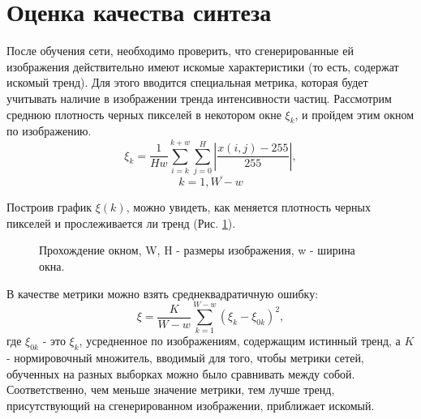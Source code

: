 \clearpage
\section{Оценка качества синтеза}
	После обучения сети, необходимо проверить, что сгенерированные ей изображения действительно имеют искомые характеристики (то есть, содержат искомый тренд). Для этого вводится специальная метрика, которая будет учитывать наличие в изображении тренда интенсивности частиц. Рассмотрим среднюю плотность черных пикселей в некотором окне $\xi_k$, и пройдем этим окном по изображению.
	$$\xi_k = \frac{1}{H w}{\sum_{i=k}^{k+w} \sum_{j=0}^{H}\left| \frac{x(i, j) - 255}{255} \right|}, $$$$k = \overline{1, W - w} $$
	
	Построив график $\xi(k)$, можно увидеть, как меняется плотность черных пикселей и прослеживается ли тренд (Рис. \ref{7-window}).
	
	\begin{figure}[h!]
		\caption{Прохождение окном, W, H - размеры изображения, w - ширина окна.}
		\label{7-window}
	\end{figure}
	
	В качестве метрики можно взять среднеквадратичную ошибку:
	$$ \xi = \frac{K}{W-w}\sum_{k=1}^{W-w} (\xi_k - \xi_{0k})^2,$$
	где $\xi_{0k}$ - это $\xi_k$, усредненное по изображениям, содержащим истинный тренд, а $K$ - нормировочный множитель, вводимый для того, чтобы метрики сетей, обученных на разных выборках можно было сравнивать между собой. Соответственно, чем меньше значение метрики, тем лучше тренд, присутствующий на сгенерированном изображении, приближает искомый.